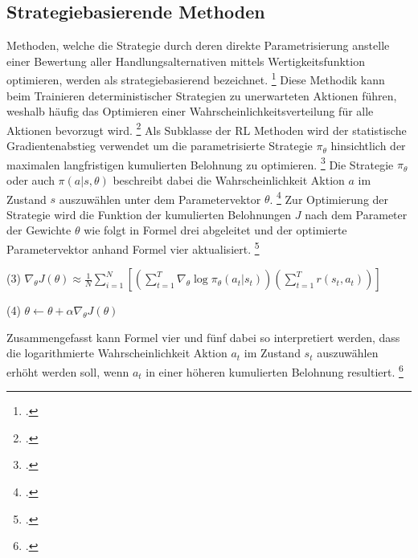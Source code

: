 \subsection{Strategiebasierende Methoden}
Methoden, welche die Strategie durch deren direkte Parametrisierung anstelle einer Bewertung aller Handlungsalternativen mittels Wertigkeitsfunktion optimieren, werden als strategiebasierend bezeichnet. \footcite[Vgl.][S. 2]{Zhang.2018}
Diese Methodik kann beim Trainieren deterministischer Strategien zu unerwarteten Aktionen führen, weshalb häufig das Optimieren einer Wahrscheinlichkeitsverteilung für alle Aktionen bevorzugt wird. \footcite[Vgl.][S. 3]{Ningombam.2022}
Als Subklasse der RL Methoden wird der statistische Gradientenabstieg verwendet um die parametrisierte Strategie $\pi_{\theta}$ hinsichtlich der maximalen langfristigen kumulierten Belohnung zu optimieren. \footcite[Vgl.][S. 3]{Ningombam.2022}
Die Strategie $\pi_{\theta}$ oder auch $\pi(a|s,\theta)$ beschreibt dabei die Wahrscheinlichkeit Aktion $a$ im Zustand $s$ auszuwählen unter dem Parametervektor $\theta$. \footcite[Vgl.][S. 321]{Sutton.2018}
Zur Optimierung der Strategie wird die Funktion der kumulierten Belohnungen $J$ nach dem Parameter der Gewichte $\theta$ wie folgt in Formel drei abgeleitet und der optimierte Parametervektor anhand Formel vier aktualisiert. \footcite[Vgl.][S. 6]{Wang.2020}
\begin{description}
    \item \begin{center} (3) $\nabla_{\theta}J(\theta) \approx \frac{1}{N} \sum \limits_{i=1}^{N} \left[(\sum \limits_{t=1}^{T} \nabla_{\theta}\log\pi_{\theta}(a_{t}|s_{t}))(\sum \limits_{t=1}^{T} r(s_{t},a_{t}))\right]$ \end{center}
    \item \begin{center} (4) $\theta \leftarrow \theta + \alpha\nabla_{\theta}J(\theta)$ \end{center}
\end{description}
Zusammengefasst kann Formel vier und fünf dabei so interpretiert werden, dass die logarithmierte Wahrscheinlichkeit Aktion $a_{t}$ im Zustand $s_{t}$ auszuwählen erhöht werden soll, wenn $a_{t}$ in einer höheren kumulierten Belohnung resultiert. \footcite[Vgl.][S. 6]{Wang.2020}

